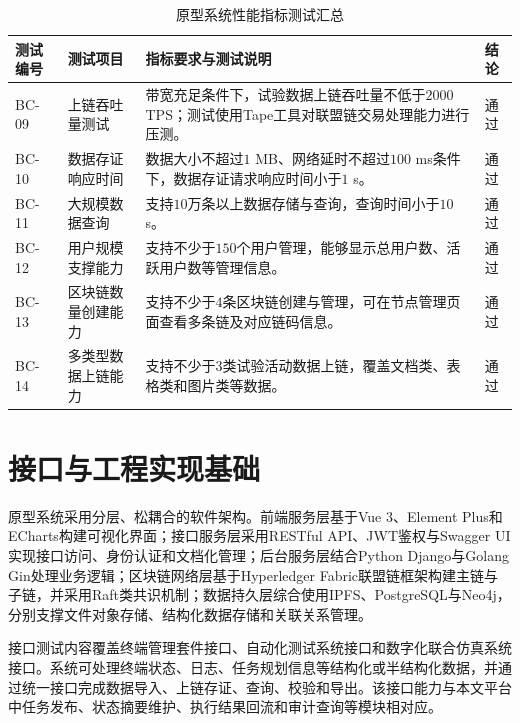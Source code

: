 \begin{appendices}
  \begin{table}[htbp]
    \centering
    \caption{原型系统性能指标测试汇总}
    \label{tab:app_performance_cases}
    \begin{tabular}{p{1.8cm}p{3.4cm}p{6.8cm}p{1.5cm}}
      \toprule
      测试编号  & 测试项目      & 指标要求与测试说明                                                  & 结论 \\
      \midrule
      BC-09 & 上链吞吐量测试   & 带宽充足条件下，试验数据上链吞吐量不低于\(2000\) TPS；测试使用Tape工具对联盟链交易处理能力进行压测。 & 通过 \\
      BC-10 & 数据存证响应时间  & 数据大小不超过\(1\) MB、网络延时不超过\(100\) ms条件下，数据存证请求响应时间小于\(1\) s。  & 通过 \\
      BC-11 & 大规模数据查询   & 支持\(10\)万条以上数据存储与查询，查询时间小于\(10\) s。                        & 通过 \\
      BC-12 & 用户规模支撑能力  & 支持不少于\(150\)个用户管理，能够显示总用户数、活跃用户数等管理信息。                     & 通过 \\
      BC-13 & 区块链数量创建能力 & 支持不少于\(4\)条区块链创建与管理，可在节点管理页面查看多条链及对应链码信息。                  & 通过 \\
      BC-14 & 多类型数据上链能力 & 支持不少于\(3\)类试验活动数据上链，覆盖文档类、表格类和图片类等数据。                      & 通过 \\
      \bottomrule
    \end{tabular}
  \end{table}

  \section{接口与工程实现基础}

  原型系统采用分层、松耦合的软件架构。前端服务层基于Vue 3、Element Plus和ECharts构建可视化界面；接口服务层采用RESTful API、JWT鉴权与Swagger UI实现接口访问、身份认证和文档化管理；后台服务层结合Python Django与Golang Gin处理业务逻辑；区块链网络层基于Hyperledger Fabric联盟链框架构建主链与子链，并采用Raft类共识机制；数据持久层综合使用IPFS、PostgreSQL与Neo4j，分别支撑文件对象存储、结构化数据存储和关联关系管理。

  接口测试内容覆盖终端管理套件接口、自动化测试系统接口和数字化联合仿真系统接口。系统可处理终端状态、日志、任务规划信息等结构化或半结构化数据，并通过统一接口完成数据导入、上链存证、查询、校验和导出。该接口能力与本文平台中任务发布、状态摘要维护、执行结果回流和审计查询等模块相对应。


\end{appendices}
